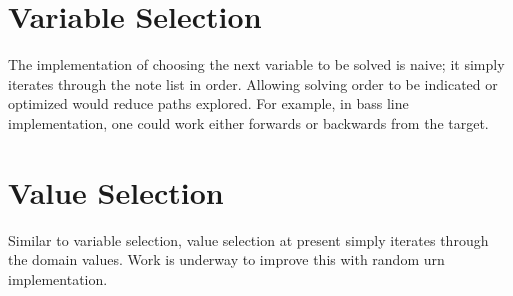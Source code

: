 \documentclass[letterpaper,10pt,english]{sphinxmanual}
\begin{document}
\begin{sphinxVerbatim}[commandchars=\\\{\}]

\end{sphinxVerbatim}


\section{Variable Selection}
\label{\detokenize{index:variable-selection}}
\sphinxAtStartPar
The implementation of choosing the next variable to be solved is naive;
it simply iterates through the note list in order. Allowing solving order
to be indicated or optimized would reduce paths explored. For example, in
bass line implementation, one could work either forwards or backwards from the target.


\section{Value Selection}
\label{\detokenize{index:value-selection}}
\sphinxAtStartPar
Similar to variable selection, value selection at present simply iterates
through the domain values. Work is underway to improve this with random urn implementation.
\end{document}
